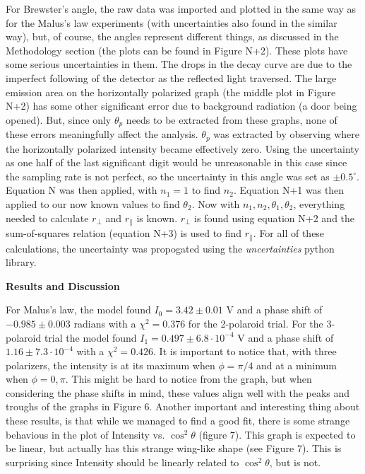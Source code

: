 \documentclass[11pt]{article}
\begin{document}
\begin{multicols}{2}
    For Brewster's angle, the raw data was imported and plotted in the same way as for the Malus's law experiments (with uncertainties also found in the similar way), but, of course, the angles represent different things, as discussed in the Methodology section (the plots can be found in Figure N+2).
    These plots have some serious uncertainties in them. The drops in the decay curve are due to the imperfect following of the detector as the reflected light traversed.
    The large emission area on the horizontally polarized graph (the middle plot in Figure N+2) has some other significant error due to background radiation (a door being opened).
    But, since only $\theta_p$ needs to be extracted from these graphs, none of these errors meaningfully affect the analysis.
    $\theta_p$ was extracted by observing where the horizontally polarized intensity became effectively zero.
    Using the uncertainty as one half of the last significant digit would be unreasonable in this case since the sampling rate is not perfect, so the uncertainty in this angle was set as $\pm 0.5 ^\circ$. Equation N was then applied, with $n_1 = 1$ to find $n_2$. Equation N+1 was then applied to our now known values to find $\theta_2$. Now with $n_1, n_2, \theta_1, \theta_2$, everything needed to calculate $r_\perp$ and $r_\parallel$ is known. $r_\perp$ is found using equation N+2 and the sum-of-squares relation (equation N+3) is used to find $r_\parallel$. For all of these calculations, the uncertainty was propogated using the \textit{uncertainties} python library.

    \vspace{10pt}

     \selectfont \textbf{Results and Discussion}
    
     \selectfont

    For Malus's law, the model found $I_0 = 3.42 \pm 0.01$ V and a phase shift of $-0.985 \pm 0.003$ radians with a $\chi^2 = 0.376$ for the 2-polaroid trial. For the 3-polaroid trial the model found $I_1 = 0.497 \pm 6.8 \cdot 10^{-4}$ V and a phase shift of $1.16 \pm 7.3 \cdot 10^{-4}$ with a $\chi^2 = 0.426$.
    It is important to notice that, with three polarizers, the intensity is at its maximum when $\phi=\pi/4$ and at a minimum when $\phi= 0, \pi$. This might be hard to notice from the graph, but when considering the phase shifts in mind, these values align well with the peaks and troughs of the graphs in Figure 6.
    Another important and interesting thing about these results, is that while we managed to find a good fit, there is some strange behavious in the plot of Intensity vs. $\cos^2 \theta$ (figure 7). This graph is expected to be linear, but actually has this strange wing-like shape (see Figure 7). This is surprising since Intensity should be linearly related to $\cos^2 \theta$, but is not.
    


\end{multicols}
\end{document}
